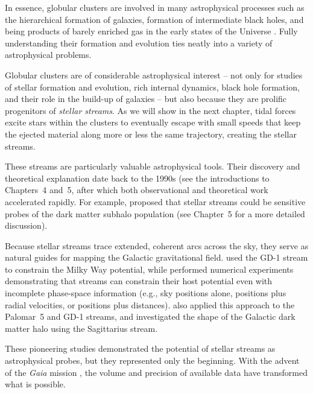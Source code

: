     In essence, globular clusters are involved in many astrophysical processes such as the hierarchical formation of galaxies, formation of intermediate black holes, and being products of barely enriched gas in the early states of the Universe \citep{2016ApJ...823...52K,2025arXiv250116438K}. Fully understanding their formation and evolution ties neatly into a variety of astrophysical problems.

    Globular clusters are of considerable astrophysical interest -- not only for studies of stellar formation and evolution, rich internal dynamics, black hole formation, and their role in the build-up of galaxies -- but also because they are prolific progenitors of \textit{stellar streams}. As we will show in the next chapter, tidal forces excite stars within the clusters to eventually escape with small speeds that keep the ejected material along more or less the same trajectory, creating the stellar streams.

    These streams are particularly valuable astrophysical tools. Their discovery and theoretical explanation date back to the 1990s (see the introductions to Chapters~4 and~5, after which both observational and theoretical work accelerated rapidly. For example, \citet{2002MNRAS.332..915I} proposed that stellar streams could be sensitive probes of the dark matter subhalo population (see Chapter~5 for a more detailed discussion).

    Because stellar streams trace extended, coherent arcs across the sky, they serve as natural guides for mapping the Galactic gravitational field. \citet{2010ApJ...712..260K} used the GD-1 stream to constrain the Milky Way potential, while \citet{2011MNRAS.417..198V} performed numerical experiments demonstrating that streams can constrain their host potential even with incomplete phase-space information (e.g., sky positions alone, positions plus radial velocities, or positions plus distances). \citet{2016ApJ...833...31B} also applied this approach to the Palomar~5 and GD-1 streams, and \citet{2010ApJ...718.1128L} investigated the shape of the Galactic dark matter halo using the Sagittarius stream.

    These pioneering studies demonstrated the potential of stellar streams as astrophysical probes, but they represented only the beginning. With the advent of the \emph{Gaia} mission \citep{2001A&A...369..339P}, the volume and precision of available data have transformed what is possible.

